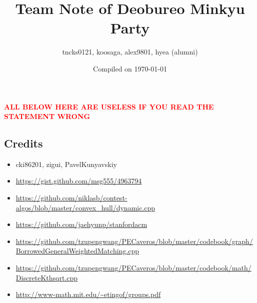 \documentclass[landscape, 8pt, a4paper, oneside, twocolumn]{extarticle}
\title{Team Note of Deobureo Minkyu Party}
\author{tncks0121, koosaga, alex9801, hyea (alumni)}
\date{Compiled on \today}
\begin{document}
{
	\Large

	\maketitle

\tableofcontents
}
\thispagestyle{fancy}
\pagebreak

\textcolor{red}{\textbf{ALL BELOW HERE ARE USELESS IF YOU READ THE STATEMENT WRONG}}









\subsection {Credits}
\begin{itemize}[noitemsep,nolistsep]
	\item cki86201, zigui, PavelKunyavskiy
	\item \url{https://gist.github.com/msg555/4963794}
	\item \url{https://github.com/niklasb/contest-algos/blob/master/convex_hull/dynamic.cpp}
	\item \url{https://github.com/jaehyunp/stanfordacm}
	\item \url{https://github.com/tzupengwang/PECaveros/blob/master/codebook/graph/BorrowedGeneralWeightedMatching.cpp}
	\item \url{https://github.com/tzupengwang/PECaveros/blob/master/codebook/math/DiscreteKthsqrt.cpp}
	\item \url{http://www-math.mit.edu/~etingof/groups.pdf}
\end{itemize}
\end{document}
